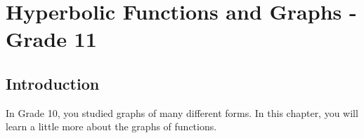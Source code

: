 \chapter{Hyperbolic Functions and Graphs - Grade 11}
\label{m:fg:h11}

\section{Introduction}
In Grade 10, you studied graphs of many different forms. In this chapter, you will learn a little more about the graphs of functions.


